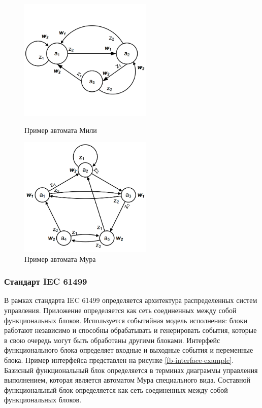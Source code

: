 \documentclass[14pt]{article}
\begin{document}
\begin{figure}
\centering
\begin{minipage}{.5\textwidth}
    \centering
    \includegraphics[width=2.5in]{pic/Aa_mili_ex2.png}
    \caption{Пример автомата Мили}
    \label{mili-example}
\end{minipage}%
\begin{minipage}{.5\textwidth}
    \centering
    \includegraphics[width=2.5in]{pic/Aa_moor_ex1.png}
    \caption{Пример автомата Мура}
    \label{moor-example}
\end{minipage}
\end{figure}

\subsubsection{Стандарт IEC 61499}

В рамках стандарта IEC 61499 определяется архитектура распределенных систем управления.
Приложение определяется как сеть соединенных между собой функциональных блоков.
Используется событийная модель исполнения: блоки работают независимо и способны
обрабатывать и генерировать события, которые в свою очередь могут быть обработаны
другими блоками. Интерфейс функционального блока определяет входные и выходные события и переменные блока.
Пример интерфейса представлен на рисунке \ref{fb-interface-example}.
Базисный функциональный блок определяется в терминах диаграммы управления выполнением, которая является
автоматом Мура специального вида.
Составной функциональный блок определяется как сеть соединенных между собой функциональных блоков.
\end{document}

